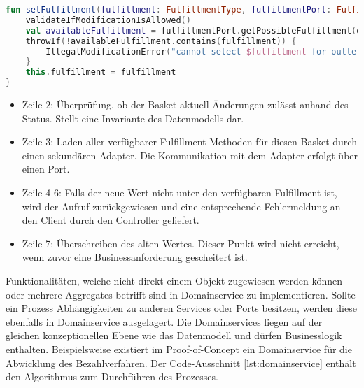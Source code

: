
\begin{minipage}{\linewidth} %
	\begin{lstlisting}[caption={Setzen der Fulfillment Methode im Basket Aggregate}, label={lst:basket}, language=Kotlin]
fun setFulfillment(fulfillment: FulfillmentType, fulfillmentPort: FulfillmentPort) {
	validateIfModificationIsAllowed()
	val availableFulfillment = fulfillmentPort.getPossibleFulfillment(outletId)
	throwIf(!availableFulfillment.contains(fulfillment)) {
		IllegalModificationError("cannot select $fulfillment for outlet $outletId")
	}
	this.fulfillment = fulfillment
}
	\end{lstlisting}
\end{minipage}

\begin{itemize}[noitemsep,nolistsep]
	\item Zeile 2: Überprüfung, ob der Basket aktuell Änderungen zulässt anhand des Status. Stellt eine Invariante des Datenmodells dar.
	\item Zeile 3: Laden aller verfügbarer Fulfillment Methoden für diesen Basket durch einen sekundären Adapter. Die Kommunikation mit dem Adapter erfolgt über einen Port.
	\item Zeile 4-6: Falls der neue Wert nicht unter den verfügbaren Fulfillment ist, wird der Aufruf zurückgewiesen und eine entsprechende Fehlermeldung an den Client durch den Controller geliefert.
	\item Zeile 7: Überschreiben des alten Wertes. Dieser Punkt wird nicht erreicht, wenn zuvor eine Businessanforderung gescheitert ist.
\end{itemize}

Funktionalitäten, welche nicht direkt einem Objekt zugewiesen werden können oder mehrere Aggregates betrifft sind in Domainservice zu implementieren. Sollte ein Prozess Abhängigkeiten zu anderen Services oder Ports besitzen, werden diese ebenfalls in Domainservice ausgelagert. Die Domainservices liegen auf der gleichen konzeptionellen Ebene wie das Datenmodell und dürfen Businesslogik enthalten. Beispielsweise existiert im Proof-of-Concept ein Domainservice für die Abwicklung des Bezahlverfahren. Der Code-Ausschnitt \ref{lst:domainservice} enthält den Algorithmus zum Durchführen des Prozesses. 

